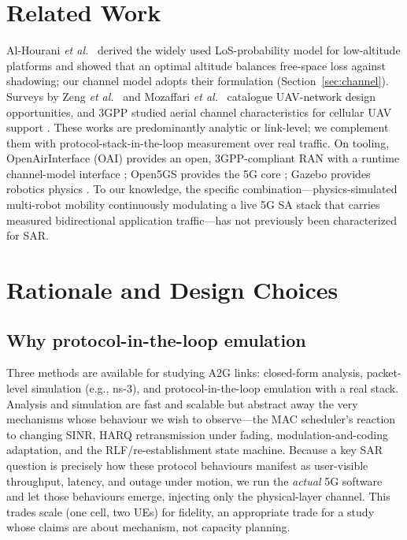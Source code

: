 \documentclass[10pt, conference]{IEEEtran}
\begin{document}
\section{Related Work}
Al-Hourani \emph{et al.}~\cite{alhourani2014optimal} derived the widely used LoS-probability model for low-altitude platforms and showed that an optimal altitude balances free-space loss against shadowing; our channel model adopts their formulation (Section~\ref{sec:channel}). Surveys by Zeng \emph{et al.}~\cite{zeng2016wireless} and Mozaffari \emph{et al.}~\cite{mozaffari2019tutorial} catalogue UAV-network design opportunities, and 3GPP studied aerial channel characteristics for cellular UAV support \cite{3gpp36777}. These works are predominantly analytic or link-level; we complement them with protocol-stack-in-the-loop measurement over real traffic. On tooling, OpenAirInterface (OAI) provides an open, 3GPP-compliant RAN with a runtime channel-model interface \cite{nikaein2014oai}; Open5GS provides the 5G core \cite{open5gs}; Gazebo provides robotics physics \cite{koenig2004gazebo}. To our knowledge, the specific combination---physics-simulated multi-robot mobility continuously modulating a live 5G SA stack that carries measured bidirectional application traffic---has not previously been characterized for SAR.

\section{Rationale and Design Choices}
\subsection{Why protocol-in-the-loop emulation}
Three methods are available for studying A2G links: closed-form analysis, packet-level simulation (e.g., ns-3), and protocol-in-the-loop emulation with a real stack. Analysis and simulation are fast and scalable but abstract away the very mechanisms whose behaviour we wish to observe---the MAC scheduler's reaction to changing SINR, HARQ retransmission under fading, modulation-and-coding adaptation, and the RLF/re-establishment state machine. Because a key SAR question is precisely how these protocol behaviours manifest as user-visible throughput, latency, and outage under motion, we run the \emph{actual} 5G software and let those behaviours emerge, injecting only the physical-layer channel. This trades scale (one cell, two UEs) for fidelity, an appropriate trade for a study whose claims are about mechanism, not capacity planning.
\end{document}
